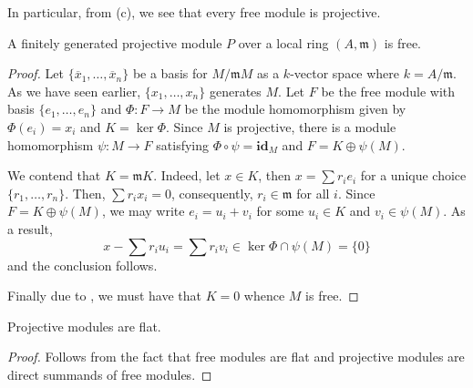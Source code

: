 In particular, from (c), we see that every free module is projective.

\begin{lemma}
    A finitely generated projective module $P$ over a local ring $(A,\mathfrak m)$ is free.
\end{lemma}
\begin{proof}
    Let $\{\overline x_1,\ldots,\overline x_n\}$ be a basis for $M/\mathfrak mM$ as a $k$-vector space where $k = A/\mathfrak m$. As we have seen earlier, $\{x_1,\ldots,x_n\}$ generates $M$. Let $F$ be the free module with basis $\{e_1,\ldots,e_n\}$ and $\Phi: F\to M$ be the module homomorphism given by $\Phi(e_i) = x_i$ and $K = \ker\Phi$. Since $M$ is projective, there is a module homomorphism $\psi: M\to F$ satisfying $\Phi\circ\psi = \mathbf{id}_M$ and $F = K\oplus\psi(M)$.

    We contend that $K = \mathfrak mK$. Indeed, let $x\in K$, then $x = \sum r_ie_i$ for a unique choice $\{r_1,\ldots,r_n\}$. Then, $\sum r_ix_i = 0$, consequently, $r_i\in\mathfrak m$ for all $i$. Since $F = K\oplus\psi(M)$, we may write $e_i = u_i + v_i$ for some $u_i\in K$ and $v_i\in\psi(M)$. As a result, 
    \begin{equation*}
        x - \sum r_iu_i = \sum r_iv_i\in\ker\Phi\cap\psi(M) = \{0\}
    \end{equation*}
    and the conclusion follows.

    Finally due to , we must have that $K = 0$ whence $M$ is free.
\end{proof}

\begin{proposition}
    Projective modules are flat.
\end{proposition}
\begin{proof}
    Follows from the fact that free modules are flat and projective modules are direct summands of free modules.
\end{proof}

